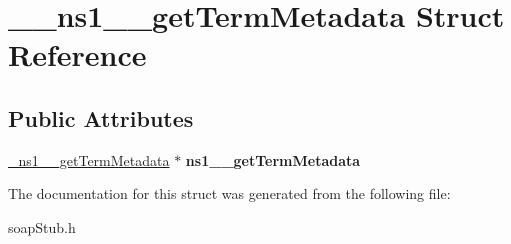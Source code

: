 \hypertarget{struct____ns1____getTermMetadata}{
\section{\_\-\_\-ns1\_\-\_\-getTermMetadata Struct Reference}
\label{struct____ns1____getTermMetadata}
}
\subsection*{Public Attributes}
\begin{DoxyCompactItemize}
\item 
\hypertarget{struct____ns1____getTermMetadata_a16596a8538802b0b17375079061ee9b2}{
\hyperlink{class__ns1____getTermMetadata}{\_\-ns1\_\-\_\-getTermMetadata} $\ast$ {\bfseries ns1\_\-\_\-getTermMetadata}}
\label{struct____ns1____getTermMetadata_a16596a8538802b0b17375079061ee9b2}

\end{DoxyCompactItemize}


The documentation for this struct was generated from the following file:\begin{DoxyCompactItemize}
\item 
soapStub.h\end{DoxyCompactItemize}
